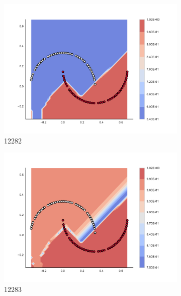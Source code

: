 \begin{figure}[h]
\begin{subfigure}[b]{0.09\textwidth}
    \includegraphics[clip, trim=2.35cm 1.75cm 4.5cm 0cm,width=\textwidth]{img/convergence/12282.pdf}
    \caption{12282}
    \label{fig:convergence_12282}
\end{subfigure}
%
\begin{subfigure}[b]{0.09\textwidth}
    \includegraphics[clip, trim=2.35cm 1.75cm 4.5cm 0cm,width=\textwidth]{img/convergence/12283.pdf}
    \caption{12283}
    \label{fig:convergence_12283}
\end{subfigure}
%
\begin{subfigure}[b]{0.09\textwidth}

\end{subfigure}
\end{figure}
